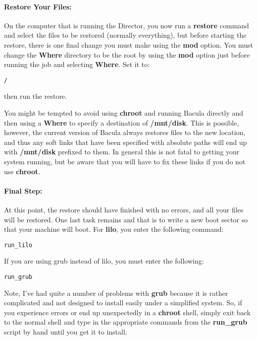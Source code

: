 \paragraph*{Restore Your Files:}

On the computer that is running the Director, you now run a {\bf restore}
command and select the files to be restored (normally everything), but before
starting the restore, there is one final change you must make using the {\bf
mod} option. You must change the {\bf Where} directory to be the root by using
the {\bf mod} option just before running the job and selecting {\bf Where}.
Set it to: 

\footnotesize
\begin{verbatim}
/
\end{verbatim}
\normalsize

then run the restore. 

You might be tempted to avoid using {\bf chroot} and running Bacula directly
and then using a {\bf Where} to specify a destination of {\bf /mnt/disk}. This
is possible, however, the current version of Bacula always restores files to
the new location, and thus any soft links that have been specified with
absolute paths will end up with {\bf /mnt/disk} prefixed to them. In general
this is not fatal to getting your system running, but be aware that you will
have to fix these links if you do not use {\bf chroot}. 

\paragraph*{Final Step:}

At this point, the restore should have finished with no errors, and all your
files will be restored. One last task remains and that is to write a new boot
sector so that your machine will boot. For {\bf lilo}, you enter the following
command: 

\footnotesize
\begin{verbatim}
run_lilo
\end{verbatim}
\normalsize

If you are using grub instead of lilo, you must enter the following: 

\footnotesize
\begin{verbatim}
run_grub
\end{verbatim}
\normalsize

Note, I've had quite a number of problems with {\bf grub} because it is rather
complicated and not designed to install easily under a simplified system. So,
if you experience errors or end up unexpectedly in a {\bf chroot} shell,
simply exit back to the normal shell and type in the appropriate commands from
the {\bf run\_grub} script by hand until you get it to install. 

